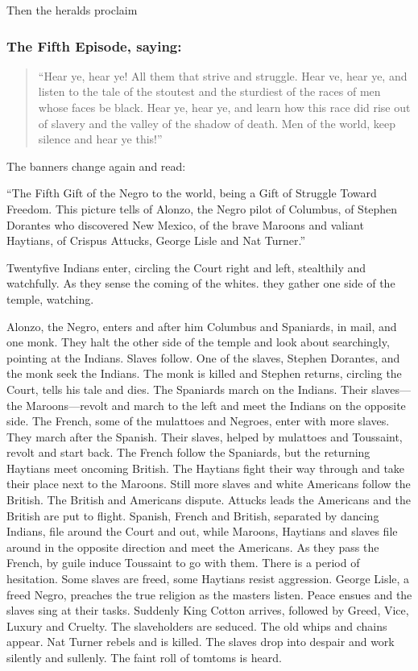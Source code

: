 \documentclass[letterpaper,10pt,english]{jupyterBook}
\begin{document}
\sphinxAtStartPar
Then the heralds proclaim


\subsubsection{The Fifth Episode, saying:}
\label{\detokenize{Volumes/06/07/national_emancipation_exposition:the-fifth-episode-saying}}\begin{quote}

\sphinxAtStartPar
“Hear ye, hear ye! All them that strive and struggle. Hear ve, hear ye, and listen to the tale of the stoutest and the sturdiest of the races of men whose faces be black. Hear ye, hear ye, and learn how this race did rise out of slavery and the valley of the shadow of death. Men of the world, keep silence and hear ye this!”
\end{quote}

\sphinxAtStartPar
The banners change again and read:

\sphinxAtStartPar
“The Fifth Gift of the Negro to the world, being a Gift of Struggle Toward Freedom. This picture tells of Alonzo, the Negro pilot of Columbus, of Stephen Dorantes who discovered New Mexico, of the brave Maroons and valiant Haytians, of Crispus Attucks, George Lisle and Nat Turner.”

\sphinxAtStartPar
Twenty\sphinxhyphen{}five Indians enter, circling the Court right and left, stealthily and watchfully. As they sense the coming of the whites. they gather one side of the temple, watching.

\sphinxAtStartPar
Alonzo, the Negro, enters and after him Columbus and Spaniards, in mail, and one monk. They halt the other side of the temple and look about searchingly, pointing at the Indians. Slaves follow. One of the slaves, Stephen Dorantes, and the monk seek the Indians. The monk is killed and Stephen returns, circling the Court, tells his tale and dies. The Spaniards march on the Indians. Their slaves—the Maroons—revolt and march to the left and meet the Indians on the opposite side. The French, some of the mulattoes and Negroes, enter with more slaves. They march after the Spanish. Their slaves, helped by mulattoes and Toussaint, revolt and start back. The French follow the Spaniards, but the returning Haytians meet oncoming British. The Haytians fight their way through and take their place next to the Maroons. Still more slaves and white Americans follow the British. The British and Americans dispute. Attucks leads the Americans and the British are put to flight. Spanish, French and British, separated by dancing Indians, file around the Court and out, while Maroons, Haytians and slaves file around in the opposite direction and meet the Americans. As they pass the French, by guile induce Toussaint to go with them. There is a period of hesitation. Some slaves are freed, some Haytians resist aggression. George Lisle, a freed Negro, preaches the true religion as the masters listen. Peace ensues and the slaves sing at their tasks. Suddenly King Cotton arrives, followed by Greed, Vice, Luxury and Cruelty. The slaveholders are seduced. The old whips and chains appear. Nat Turner rebels and is killed. The slaves drop into despair and work silently and sullenly. The faint roll of tomtoms is heard.
\end{document}
